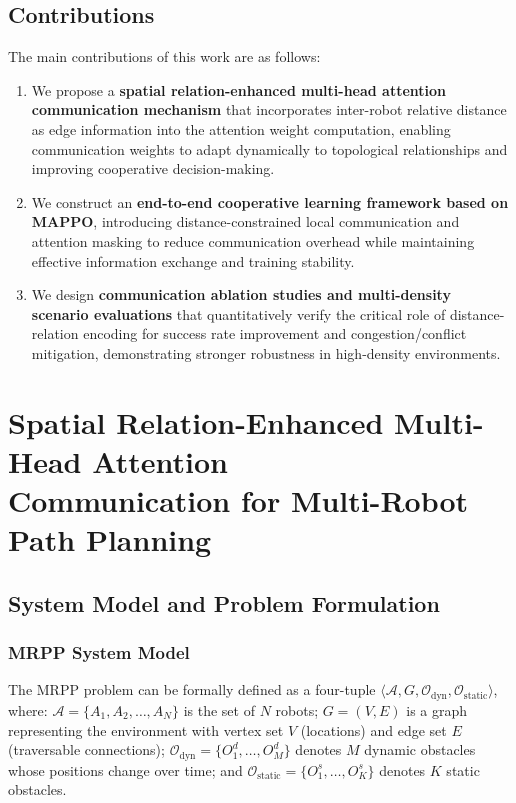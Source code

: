 \documentclass[conference]{IEEEtran}
\begin{document}
\subsection{Contributions}

The main contributions of this work are as follows:
\begin{enumerate}
\item We propose a \textbf{spatial relation-enhanced multi-head
      attention communication mechanism} that incorporates
      inter-robot relative distance as edge information into the
      attention weight computation, enabling communication weights
      to adapt dynamically to topological relationships and
      improving cooperative decision-making.
\item We construct an \textbf{end-to-end cooperative learning
      framework based on MAPPO}, introducing distance-constrained
      local communication and attention masking to reduce
      communication overhead while maintaining effective
      information exchange and training stability.
\item We design \textbf{communication ablation studies and
      multi-density scenario evaluations} that quantitatively
      verify the critical role of distance-relation encoding for
      success rate improvement and congestion/conflict mitigation,
      demonstrating stronger robustness in high-density
      environments.
\end{enumerate}

\section{Spatial Relation-Enhanced Multi-Head Attention\\
Communication for Multi-Robot Path Planning}

\subsection{System Model and Problem Formulation}

\subsubsection{MRPP System Model}

The MRPP problem can be formally defined as a four-tuple
$\langle \mathcal{A}, G, \mathcal{O}_{\mathrm{dyn}},
\mathcal{O}_{\mathrm{static}} \rangle$, where:
$\mathcal{A}=\{A_1, A_2, \ldots, A_N\}$ is the set of $N$ robots;
$G=(V,E)$ is a graph representing the environment with vertex set
$V$ (locations) and edge set $E$ (traversable connections);
$\mathcal{O}_{\mathrm{dyn}}=\{O_1^d, \ldots, O_M^d\}$ denotes $M$
dynamic obstacles whose positions change over time; and
$\mathcal{O}_{\mathrm{static}}=\{O_1^s, \ldots, O_K^s\}$ denotes
$K$ static obstacles.
\end{document}
